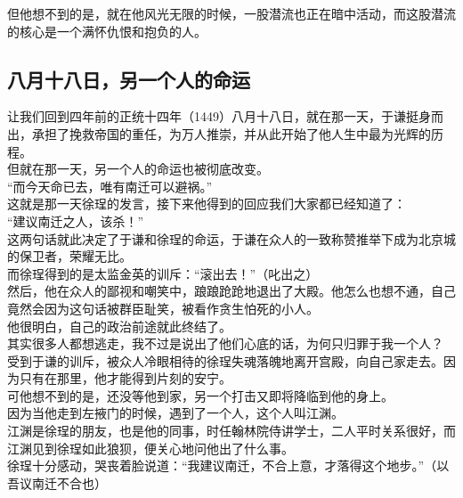 \begin{multicols}{\theparacolNo}
但他想不到的是，就在他风光无限的时候，一股潜流也正在暗中活动，而这股潜流的核心是一个满怀仇恨和抱负的人。\\

\subsection{八月十八日，另一个人的命运}
让我们回到四年前的正统十四年（1449）八月十八日，就在那一天，于谦挺身而出，承担了挽救帝国的重任，为万人推崇，并从此开始了他人生中最为光辉的历程。\\

但就在那一天，另一个人的命运也被彻底改变。\\

“而今天命已去，唯有南迁可以避祸。”\\

这就是那一天徐珵的发言，接下来他得到的回应我们大家都已经知道了：\\

“建议南迁之人，该杀！”\\

这两句话就此决定了于谦和徐珵的命运，于谦在众人的一致称赞推举下成为北京城的保卫者，荣耀无比。\\

而徐珵得到的是太监金英的训斥：“滚出去！”（叱出之）\\

然后，他在众人的鄙视和嘲笑中，踉踉跄跄地退出了大殿。他怎么也想不通，自己竟然会因为这句话被群臣耻笑，被看作贪生怕死的小人。\\

他很明白，自己的政治前途就此终结了。\\

其实很多人都想逃走，我不过是说出了他们心底的话，为何只归罪于我一个人？\\

受到于谦的训斥，被众人冷眼相待的徐珵失魂落魄地离开宫殿，向自己家走去。因为只有在那里，他才能得到片刻的安宁。\\

可他想不到的是，还没等他到家，另一个打击又即将降临到他的身上。\\

因为当他走到左掖门的时候，遇到了一个人，这个人叫江渊。\\

江渊是徐珵的朋友，也是他的同事，时任翰林院侍讲学士，二人平时关系很好，而江渊见到徐珵如此狼狈，便关心地问他出了什么事。\\

徐珵十分感动，哭丧着脸说道：“我建议南迁，不合上意，才落得这个地步。”（以吾议南迁不合也）\\


\end{multicols}
